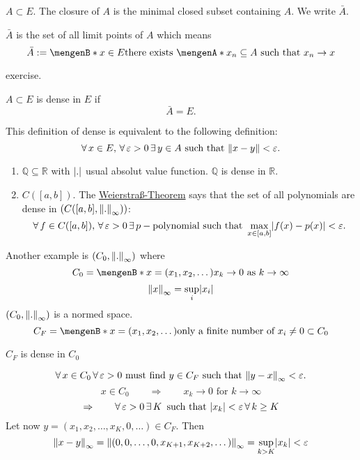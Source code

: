 \begin{definition*}[closure]
	$A \subset E$. The closure of $A$ is the minimal closed subset containing $A$. We write $\bar{A}$.
\end{definition*}
\begin{proposition}
	$\bar{A}$ is the set of all limit points of $A$ which means
	\[
		\bar{A} := \set[x \in E]{\text{there exists $\set{x_n} \subseteq A$ such that $x_n \to x$}}
	\]
\end{proposition}
\begin{beweis}
	exercise.
\end{beweis}
\begin{definition*}[dense]
	$A \subset E$ is dense in $E$ if 
	\[
		\bar{A} = E.
	\]
\end{definition*}
\begin{bemerkung}
	This definition of dense is equivalent to the following definition:
	\[
		\forall\, x \in E,\,\forall\, \varepsilon>0 \,\exists\,y \in A \text{ such that } \norm{x-y} < \varepsilon.
	\]
\end{bemerkung}
\begin{beispiele}
	\begin{enumerate}[1)]
		\item $\mathbb{Q} \subseteq \mathbb{R}$ with $\lvert.\rvert$ usual absolut value function. $\mathbb{Q}$ is dense in $\mathbb{R}$.
		\item $C([a,b])$. The \underline{Weierstraß-Theorem} says that the set of all polynomials are dense in $(C([a,b],\norm{.}_{\infty}))$:
		\[
			\forall\, f \in C([a,b]),\,\forall\, \varepsilon>0 \,\exists\,p-\text{polynomial such that }\max_{x \in [a,b]}\lvert f(x)-p(x)\rvert < \varepsilon.
		\]
	\end{enumerate}
\end{beispiele}
Another example is $(C_0, \norm{.}_{\infty})$ where
		\[
			C_0 = \set[x = (x_1,x_2,\dots)]{x_k \to 0 \text{ as }k \to \infty}
		\]
		\[
			\norm{x}_{\infty}= \sup_{i}\abs{x_i}
		\]
		$(C_0,\norm{.}_{\infty})$ is a normed space. 
		\[
			C_F = \set[x = (x_1,x_2,\dots)]{\text{only a finite number of }x_i \neq 0} \subset C_0
		\]
\begin{satz}
	$C_F$ is dense in $C_0$
\end{satz}
\begin{beweis}
	\[
		\forall\,  x \in C_0 \,\forall\, \varepsilon>0 \text{ must find }y \in C_F \text{ such that }\norm{y-x}_{\infty} < \varepsilon.
	\]
	\[
		x \in C_0 \qquad \Rightarrow \qquad x_k \to 0 \text{ for }k \to \infty 
	\]
	\[
		\Rightarrow \qquad \forall\, \varepsilon >0 \,\exists\,K \,\text{ such that } \lvert x_k\rvert < \varepsilon \, \forall\, k \geq K
	\]
	Let now $y = (x_1,x_2, \dots,x_K, 0, \dots) \in C_F$. Then 
	\[
		\norm{x-y}_{\infty} = \norm{(0,0,\dots,0,x_{K+1},x_{K+2},\dots)}_{\infty} = \sup_{k >K}\abs{x_k} < \varepsilon
	\]
\end{beweis}
